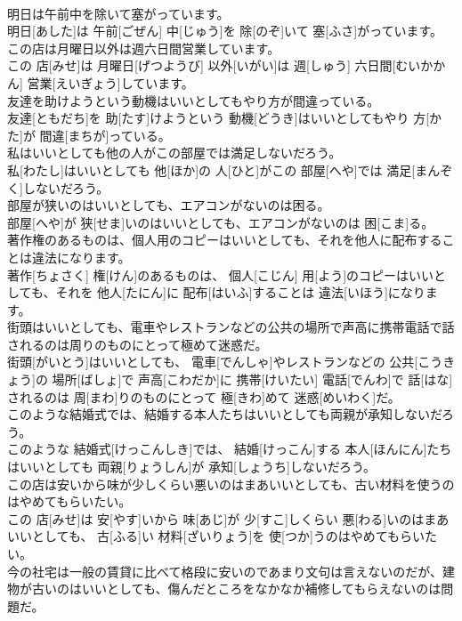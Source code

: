 \documentclass[8pt]{extreport}
\begin{document}
\begin{CJK}{UTF8}{min}
\\	明日は午前中を除いて塞がっています。	
\\	明日[あした]は 午前[ごぜん] 中[じゅう]を 除[のぞ]いて 塞[ふさ]がっています。
\\	この店は月曜日以外は週六日間営業しています。	
\\	この 店[みせ]は 月曜日[げつようび] 以外[いがい]は 週[しゅう] 六日間[むいかかん] 営業[えいぎょう]しています。
\\	友達を助けようという動機はいいとしてもやり方が間違っている。	
\\	友達[ともだち]を 助[たす]けようという 動機[どうき]はいいとしてもやり 方[かた]が 間違[まちが]っている。
\\	私はいいとしても他の人がこの部屋では満足しないだろう。	
\\	私[わたし]はいいとしても 他[ほか]の 人[ひと]がこの 部屋[へや]では 満足[まんぞく]しないだろう。
\\	部屋が狭いのはいいとしても、エアコンがないのは困る。	
\\	部屋[へや]が 狭[せま]いのはいいとしても、エアコンがないのは 困[こま]る。
\\	著作権のあるものは、個人用のコピーはいいとしても、それを他人に配布することは違法になります。	
\\	著作[ちょさく] 権[けん]のあるものは、 個人[こじん] 用[よう]のコピーはいいとしても、それを 他人[たにん]に 配布[はいふ]することは 違法[いほう]になります。
\\	街頭はいいとしても、電車やレストランなどの公共の場所で声高に携帯電話で話されるのは周りのものにとって極めて迷惑だ。	
\\	街頭[がいとう]はいいとしても、 電車[でんしゃ]やレストランなどの 公共[こうきょう]の 場所[ばしょ]で 声高[こわだか]に 携帯[けいたい] 電話[でんわ]で 話[はな]されるのは 周[まわ]りのものにとって 極[きわ]めて 迷惑[めいわく]だ。
\\	このような結婚式では、結婚する本人たちはいいとしても両親が承知しないだろう。	
\\	このような 結婚式[けっこんしき]では、 結婚[けっこん]する 本人[ほんにん]たちはいいとしても 両親[りょうしん]が 承知[しょうち]しないだろう。
\\	この店は安いから味が少しくらい悪いのはまあいいとしても、古い材料を使うのはやめてもらいたい。	
\\	この 店[みせ]は 安[やす]いから 味[あじ]が 少[すこ]しくらい 悪[わる]いのはまあいいとしても、 古[ふる]い 材料[ざいりょう]を 使[つか]うのはやめてもらいたい。
\\	今の社宅は一般の賃貸に比べて格段に安いのであまり文句は言えないのだが、建物が古いのはいいとしても、傷んだところをなかなか補修してもらえないのは問題だ。	

\end{CJK}
\end{document}
